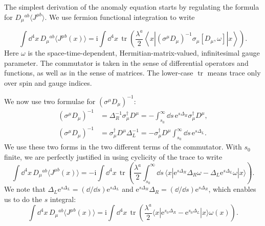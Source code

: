 
The simplest derivation of the anomaly equation starts by regulating the
formula for $D_\mu{}^{ab}\langle J^{\mu b}\rangle$. We use fermion functional
integration to write

\[
  \int\!\dd^4x\,D_\mu{}^{ab}\langle J^{\mu b}(x)\rangle
  =\mathrm{i}\int\!\dd^4x\,
  \operatorname{tr}\left(\frac{\lambda^a}{2}
  \left\langle x\left|(\sigma^\mu D_\mu)^{-1}
  \sigma_\mu[D_\mu,\omega]\right|x\right\rangle\right).
\]
Here $\omega$ is the space-time-dependent, Hermitian-matrix-valued,
infinitesimal gauge parameter. The commutator is taken in the sense of
differential operators and functions, as well as in the sense of matrices.
The lower-case $\operatorname{tr}$ means trace only over spin and gauge
indices.

We now use two formulae for $(\sigma^\mu D_\mu)^{-1}$:
\[
\begin{aligned}
  (\sigma^\mu D_\mu)^{-1}
    &=\Delta_R^{-1}\sigma_\mu^\dagger D^\mu
      =-\int_{s_0}^{\infty}\!\dd s\,
        \mathrm{e}^{s\Delta_R}\sigma_\mu^\dagger D^\mu,\\
  (\sigma^\mu D_\mu)^{-1}
    &=\sigma_\mu^\dagger D^\mu\Delta_L^{-1}
      =-\sigma_\mu^\dagger D^\mu
        \int_{s_0}^{\infty}\!\dd s\,\mathrm{e}^{s\Delta_L} .
\end{aligned}
\]
We use these two forms in the two different terms of the commutator. With
$s_0$ finite, we are perfectly justified in using cyclicity of the trace to
write
\[
  \int\!\dd^4x\,D_\mu{}^{ab}\langle J^{\mu b}(x)\rangle
  =-\mathrm{i}\int\!\dd^4x\,\operatorname{tr}\left(
  \frac{\lambda^a}{2}\int_{s_0}^{\infty}\!\dd s\,
  \langle x|\mathrm{e}^{s\Delta_R}\Delta_R\omega
  -\Delta_L\mathrm{e}^{s\Delta_L}\omega|x\rangle\right).
\]
We note that $\Delta_L\mathrm{e}^{s\Delta_L}=(\dd/\dd s)\mathrm{e}^{s\Delta_L}$
and $\mathrm{e}^{s\Delta_R}\Delta_R=(\dd/\dd s)\mathrm{e}^{s\Delta_R}$,
which enables us to do the $s$ integral:
\[
  \int\!\dd^4x\,D_\mu{}^{ab}\langle J^{\mu b}(x)\rangle
  =\mathrm{i}\int\!\dd^4x\,\operatorname{tr}\left(
  \frac{\lambda^a}{2}\langle x|
  \mathrm{e}^{s_0\Delta_R}-\mathrm{e}^{s_0\Delta_L}|x\rangle\omega(x)\right).
\]

